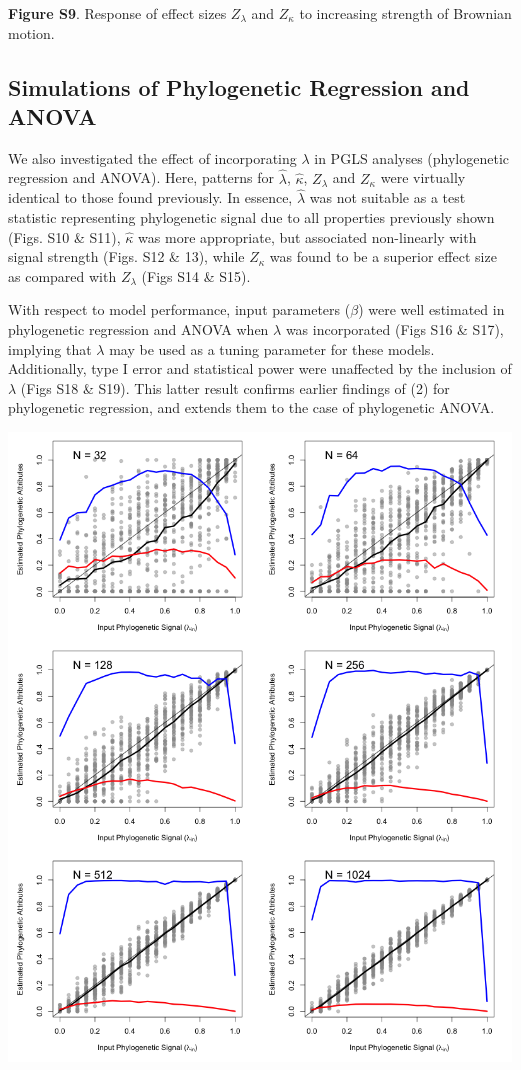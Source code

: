 \documentclass[
]{article}
\begin{document}
\textbf{Figure S9}. Response of effect sizes \(Z_{\lambda}\) and
\(Z_{\kappa}\) to increasing strength of Brownian motion.

\newpage

\hypertarget{simulations-of-phylogenetic-regression-and-anova}{%
\subsection{Simulations of Phylogenetic Regression and
ANOVA}\label{simulations-of-phylogenetic-regression-and-anova}}

We also investigated the effect of incorporating \(\lambda\) in PGLS
analyses (phylogenetic regression and ANOVA). Here, patterns for
\(\hat\lambda\), \(\hat\kappa\), \(Z_\lambda\) and \(Z_\kappa\) were
virtually identical to those found previously. In essence,
\(\hat\lambda\) was not suitable as a test statistic representing
phylogenetic signal due to all properties previously shown (Figs. S10 \&
S11), \(\hat\kappa\) was more appropriate, but associated non-linearly
with signal strength (Figs. S12 \& 13), while \(Z_\kappa\) was found to
be a superior effect size as compared with \(Z_\lambda\) (Figs S14 \&
S15). \hfill\break

With respect to model performance, input parameters (\(\beta\)) were
well estimated in phylogenetic regression and ANOVA when \(\lambda\) was
incorporated (Figs S16 \& S17), implying that \(\lambda\) may be used as
a tuning parameter for these models. Additionally, type I error and
statistical power were unaffected by the inclusion of \(\lambda\) (Figs
S18 \& S19). This latter result confirms earlier findings of (2) for
phylogenetic regression, and extends them to the case of phylogenetic
ANOVA.

\includegraphics[width=0.95\linewidth]{fig.S10}
\end{document}
